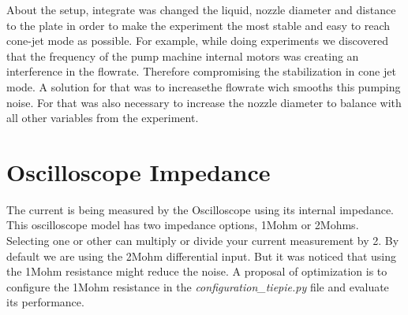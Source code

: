  About the setup, integrate was changed the liquid, nozzle diameter and distance to the plate in order to
make the experiment the most stable and easy to reach cone-jet mode as possible. For example, while doing experiments we discovered that the frequency of the pump machine internal motors was creating an interference in the flowrate. Therefore compromising the stabilization in cone jet mode. A solution for that was to increasethe flowrate wich smooths this pumping noise. For that was also necessary to increase the nozzle diameter to balance with all other variables from the experiment.


\section{Oscilloscope Impedance}
\label{sec:osc_impedance}

The current is being measured by the Oscilloscope using its internal impedance. 
This oscilloscope model has two impedance options, 1Mohm or 2Mohms. 
Selecting one or other can multiply or divide your current measurement by 2. 
By default we are using the 2Mohm differential input. But it was noticed that using the 1Mohm resistance might reduce the noise. 
A proposal of optimization is to configure the 1Mohm resistance in the \emph{configuration\_tiepie.py} file and evaluate its performance.